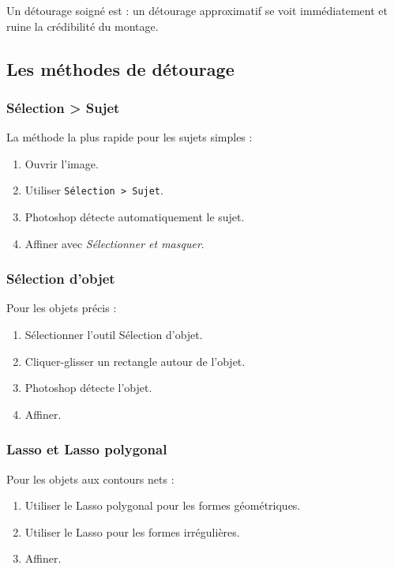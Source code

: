 Un détourage soigné est  : un détourage approximatif se voit immédiatement et ruine la crédibilité du montage.

\subsection{Les méthodes de détourage}

\subsubsection{Sélection > Sujet}

La méthode la plus rapide pour les sujets simples :

\begin{enumerate}
    \item Ouvrir l'image.
    \item Utiliser \texttt{Sélection > Sujet}.
    \item Photoshop détecte automatiquement le sujet.
    \item Affiner avec \emph{Sélectionner et masquer}.
\end{enumerate}

\subsubsection{Sélection d'objet}

Pour les objets précis :

\begin{enumerate}
    \item Sélectionner l'outil Sélection d'objet.
    \item Cliquer-glisser un rectangle autour de l'objet.
    \item Photoshop détecte l'objet.
    \item Affiner.
\end{enumerate}

\subsubsection{Lasso et Lasso polygonal}

Pour les objets aux contours nets :

\begin{enumerate}
    \item Utiliser le Lasso polygonal pour les formes géométriques.
    \item Utiliser le Lasso pour les formes irrégulières.
    \item Affiner.
\end{enumerate}

